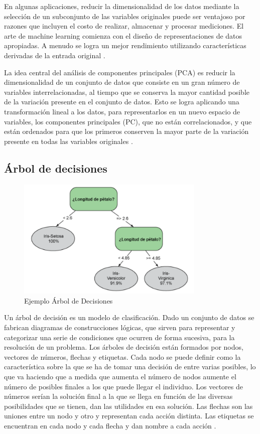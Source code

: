 \documentclass[11pt]{report}
\begin{document}
En algunas aplicaciones, reducir la dimensionalidad de los datos mediante la selección de un subconjunto de las variables originales puede ser ventajoso por razones que incluyen el costo de realizar, almacenar y procesar mediciones. El arte de machine learning comienza con el diseño de representaciones de datos apropiadas. A menudo se logra un mejor rendimiento utilizando características derivadas de la entrada original \cite{pca}.

\par
\medskip
\noindent
La idea central del análisis de componentes principales (PCA) es reducir la dimensionalidad de un conjunto de datos que consiste en un gran número de variables interrelacionadas, al tiempo que se conserva la mayor cantidad posible de la variación presente en el conjunto de datos. Esto se logra aplicando una transformación lineal a los datos, para representarlos en un nuevo espacio de variables, los componentes principales (PC), que no están correlacionados, y que están ordenados para que los primeros conserven la mayor parte de la variación presente en todas las variables originales \cite{pca2}.


\subsection {Árbol de decisiones}
\begin{figure}[H]
  \centering
    \includegraphics[width=0.8\textwidth]{fig06}
   \caption{Ejemplo Árbol de Decisiones \cite{}}
\end{figure}
 Un árbol de decisión es un modelo de clasificación. Dado un conjunto de datos se fabrican diagramas de construcciones lógicas, que sirven para representar y categorizar una serie de condiciones que ocurren de forma sucesiva, para la resolución de un problema. Los árboles de decisión están formados por nodos, vectores de números, flechas y etiquetas. Cada nodo se puede definir como la característica sobre la que se ha de tomar una decisión de entre varias posibles, lo que va haciendo que a medida que aumenta el número de nodos aumente el número de posibles finales a los que puede llegar el individuo. Los vectores de números serían la solución final a la que se llega en función de las diversas posibilidades que se tienen, dan las utilidades en esa solución. Las flechas son las uniones entre un nodo y otro y representan cada acción distinta. Las etiquetas se encuentran en cada nodo y cada flecha y dan nombre a cada acción \cite{ApplicationHAR}.
\end{document}
